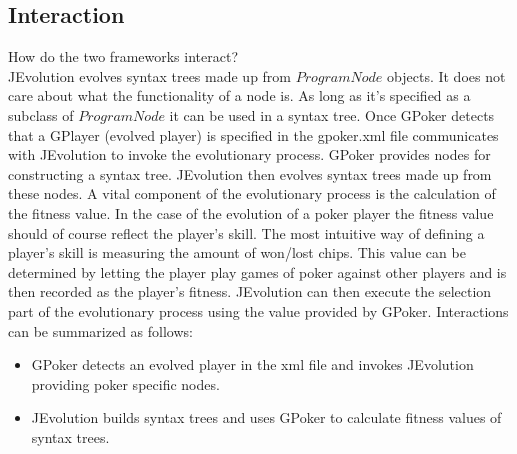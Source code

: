 \documentclass[12pt,a4paper]{article}
\begin{document}
	\subsection{Interaction}
	How do the two frameworks interact? \\
	JEvolution evolves syntax trees made up from $ProgramNode$ objects. It does not care about what the functionality of a node is. As long
	as it's specified as a subclass of $ProgramNode$ it can be used in a syntax tree.
	Once GPoker detects that a GPlayer (evolved player) is specified in the gpoker.xml file communicates with JEvolution to invoke the evolutionary process.  GPoker provides nodes 
	for constructing a syntax tree. JEvolution then evolves syntax trees made up from these nodes. A vital component of the evolutionary process is the calculation of the fitness value. In the case
	of the evolution of a poker player the fitness value should of course reflect the player's skill. The most intuitive way of defining a player's skill is measuring the amount of won/lost chips.
	This value can be determined by letting the player play games of poker against other players and is then recorded as the player's fitness. JEvolution can then execute the selection part
	of the evolutionary process using the value provided by GPoker. 
	Interactions can be summarized as follows:
	\begin{itemize}
		\item GPoker detects an evolved player in the xml file and invokes JEvolution providing poker specific nodes.
		\item JEvolution builds syntax trees and uses GPoker to calculate fitness values of syntax trees.
	\end{itemize}
	
	
\end{document}
